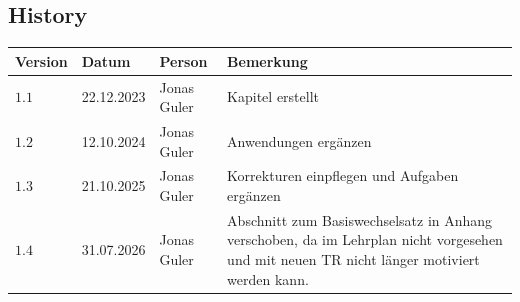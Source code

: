 \documentclass[11pt,oneside]{article}
\begin{document}
\subsection*{History}
\begin{table}[H]
	\centering
	\begin{tabular}{|p{13mm}|p{20mm}|p{30mm}|p{70mm}|}\hline
		Version & Datum & Person & Bemerkung \\\hline
		$1.1$ & 22.12.2023 & Jonas Guler & Kapitel erstellt \\\hline
		$1.2$ & 12.10.2024 & Jonas Guler & Anwendungen ergänzen \\\hline
		$1.3$ & 21.10.2025 & Jonas Guler & Korrekturen einpflegen und Aufgaben ergänzen \\\hline
		$1.4$ & 31.07.2026 & Jonas Guler & Abschnitt zum Basiswechselsatz in Anhang verschoben, da im Lehrplan nicht vorgesehen und mit neuen TR nicht länger motiviert werden kann. \\\hline
	\end{tabular}
\end{table}
\newpage

\appendix
\begingroup %
\let\oldaddcontentsline\addcontentsline
\renewcommand{\addcontentsline}[3]{}
\end{document}
